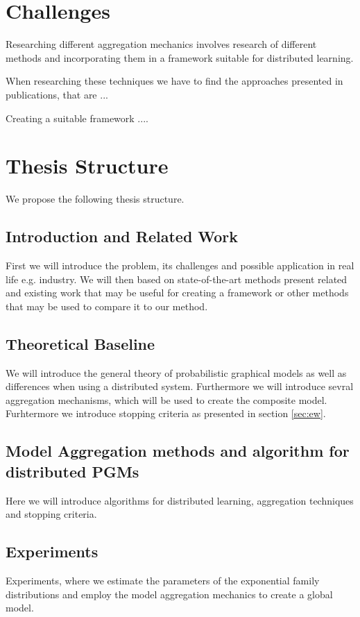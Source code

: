     \section{Challenges}
   Researching different aggregation mechanics involves research of different methods and incorporating them in a framework suitable for distributed learning.

   When researching these techniques we have to find the approaches presented in publications, that are ... 

   Creating a suitable framework ....

   
    \section{Thesis Structure}
    We propose the following thesis structure.
    
    \subsection{Introduction and Related Work}
    First we will introduce the problem, its challenges and possible application in real life e.g. industry. We will then based on state-of-the-art methods present related and existing work that may be useful for creating a framework or other methods that may be used to compare it to our method.

    \subsection{Theoretical Baseline}
    We will introduce the general theory of probabilistic graphical models as well as differences when using a distributed system. Furthermore we will introduce sevral aggregation mechanisms, which will be used to create the composite model.
    Furhtermore we introduce stopping criteria as presented in section \ref{sec:ew}.

    \subsection{Model Aggregation methods and algorithm for distributed PGMs}
    Here we will introduce algorithms for distributed learning, aggregation techniques and stopping criteria.

    \subsection{Experiments}
    Experiments, where we estimate the parameters of the exponential family distributions and employ the model aggregation mechanics to create a global model. 
